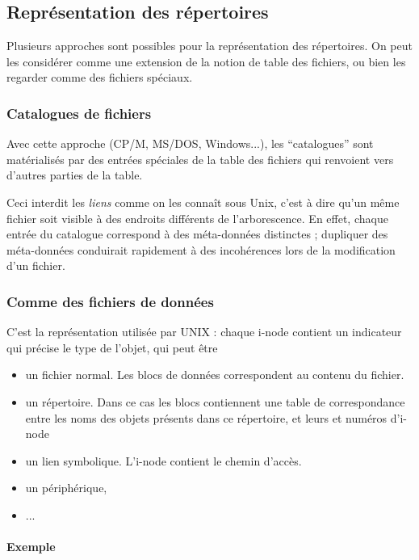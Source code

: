 \begin{multicols}{2}
\subsection{Représentation des répertoires}

Plusieurs approches sont possibles pour la représentation des
répertoires. On peut les considérer comme une extension de la notion
de table des fichiers, ou bien les regarder comme des fichiers
spéciaux.

\subsubsection{Catalogues de fichiers}

Avec cette approche (CP/M, MS/DOS, Windows...), les ``catalogues''
sont matérialisés par des entrées spéciales de la table des fichiers
qui renvoient vers d'autres parties de la table.

Ceci interdit les \emph{liens} comme on les connaît sous Unix, c'est à
dire qu'un même fichier soit visible à des endroits différents de
l'arborescence. En effet, chaque entrée du catalogue correspond à des
méta-données distinctes ; dupliquer des méta-données conduirait
rapidement à des incohérences lors de la modification d'un fichier.



\subsubsection{Comme des fichiers de données}

C'est la représentation utilisée par UNIX : chaque i-node contient un
indicateur qui précise le type de l'objet, qui peut être
\begin{itemize}
\item un fichier normal. Les blocs de données correspondent au contenu du fichier.
\item un répertoire.  Dans ce cas les blocs contiennent une table
de correspondance entre les noms des objets présents dans ce répertoire, et
leurs et numéros d'i-node
\item un lien symbolique. L'i-node contient le chemin d'accès.
\item un périphérique,
\item ...
\end{itemize}



\paragraph{Exemple}


\end{multicols}
